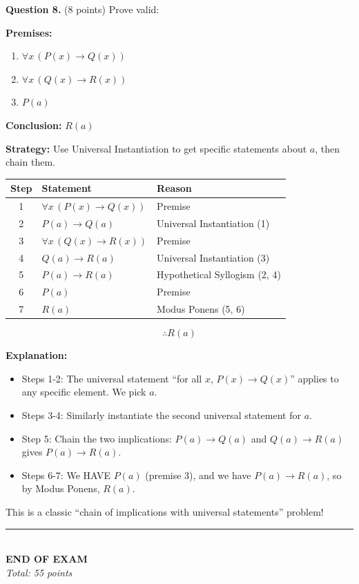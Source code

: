 \documentclass[11pt,a4paper]{article}
\begin{document}
\vspace{15pt}

\textbf{Question 8.} (8 points) Prove valid:

\textbf{Premises:}
\begin{enumerate}[noitemsep]
    \item $\forall x\, (P(x) \to Q(x))$
    \item $\forall x\, (Q(x) \to R(x))$
    \item $P(a)$
\end{enumerate}

\textbf{Conclusion:} $R(a)$

\begin{solnbox}
\textbf{Strategy:} Use Universal Instantiation to get specific statements about $a$, then chain them.

\begin{center}
\begin{tabular}{c|l|l}
\toprule
\textbf{Step} & \textbf{Statement} & \textbf{Reason} \\
\midrule
1 & $\forall x\, (P(x) \to Q(x))$ & Premise \\
2 & $P(a) \to Q(a)$ & Universal Instantiation (1) \\
3 & $\forall x\, (Q(x) \to R(x))$ & Premise \\
4 & $Q(a) \to R(a)$ & Universal Instantiation (3) \\
5 & $P(a) \to R(a)$ & Hypothetical Syllogism (2, 4) \\
6 & $P(a)$ & Premise \\
7 & $R(a)$ & Modus Ponens (5, 6) \\
\bottomrule
\end{tabular}
\end{center}

$$\boxed{\therefore R(a)}$$

\textbf{Explanation:}
\begin{itemize}[noitemsep]
    \item Steps 1-2: The universal statement ``for all $x$, $P(x) \to Q(x)$'' applies to any specific element. We pick $a$.
    \item Steps 3-4: Similarly instantiate the second universal statement for $a$.
    \item Step 5: Chain the two implications: $P(a) \to Q(a)$ and $Q(a) \to R(a)$ gives $P(a) \to R(a)$.
    \item Steps 6-7: We HAVE $P(a)$ (premise 3), and we have $P(a) \to R(a)$, so by Modus Ponens, $R(a)$.
\end{itemize}

This is a classic ``chain of implications with universal statements'' problem!
\end{solnbox}

\vspace{20pt}

\begin{center}
\rule{0.5\textwidth}{0.5pt}\\[5pt]
\textbf{END OF EXAM}\\[3pt]
\textit{Total: 55 points}
\end{center}
\end{document}
